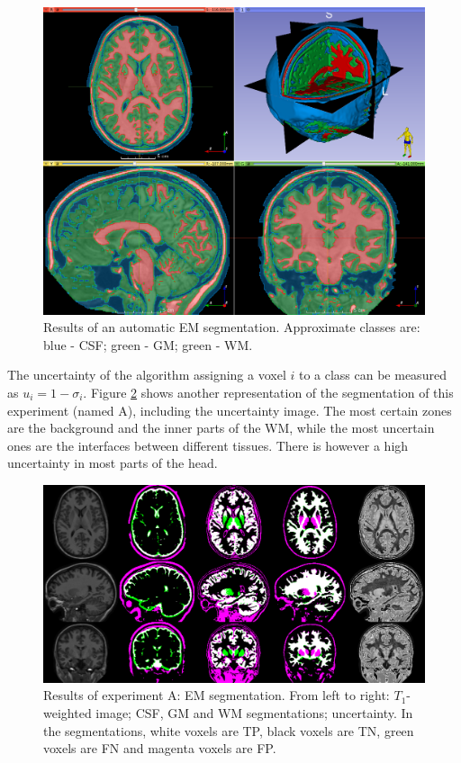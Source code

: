 \begin{figure}
  \centering
  \includegraphics[width=\textwidth]{figures/em_first}
  \caption{Results of an automatic EM segmentation. Approximate classes are: blue - CSF; green - GM; green - WM.}
  \label{fig:em-first}
\end{figure}

The uncertainty of the algorithm assigning a voxel $i$ to a class can be measured as $u_i = 1 - \sigma_i$. Figure \ref{fig:experiment-a} shows another representation of the segmentation of this experiment (named A), including the uncertainty image. The most certain zones are the background and the inner parts of the WM, while the most uncertain ones are the interfaces between different tissues. There is however a high uncertainty in most parts of the head.

\begin{figure}
  \centering
  \includegraphics[width=\textwidth]{figures/experiment_a}
  \caption{Results of experiment A: EM segmentation. From left to right: $T_1$-weighted image; CSF, GM and WM segmentations; uncertainty. In the segmentations, white voxels are TP, black voxels are TN, green voxels are FN and magenta voxels are FP.}
  \label{fig:experiment-a}
\end{figure}

